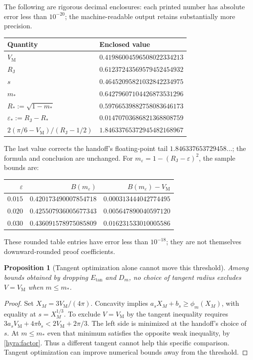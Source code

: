 \documentclass[11pt]{article}
\newtheorem{proposition}[theorem]{Proposition}
\theoremstyle{remark}\newtheorem{remark}[theorem]{Remark}
\newcommand{\VM}{V_{\mathrm M}}
\newcommand{\RJ}{R_{\mathrm J}}
\newcommand{\Et}{E_{\mathrm{tan}}}
\begin{document}
The following are rigorous decimal enclosures: each printed number has absolute error less than $10^{-20}$; the machine-readable output retains substantially more precision.
\begin{center}
\begin{tabular}{ll}\toprule
Quantity & Enclosed value\\\midrule
$\VM$ & $0.41986004596508022334213$\\
$\RJ$ & $0.61237243569579452454932$\\
$s$ & $0.46452095821032842234975$\\
$m_*$ & $0.64279607104426873531296$\\
$R_*:=\sqrt{1-m_*}$ & $0.59766539882758083646173$\\
$\varepsilon_*:=\RJ-R_*$ & $0.01470703686821368808759$\\
$2(\pi/6-\VM)/(\RJ-1/2)$ & $1.84633765372945482168967$\\\bottomrule
\end{tabular}
\end{center}
The last value corrects the handoff's floating-point tail $1.846337653729458\ldots$; the formula and conclusion are unchanged. For $m_\varepsilon=1-(\RJ-\varepsilon)^2$, the sample bounds are:
\begin{center}
\begin{tabular}{rrr}\toprule
$\varepsilon$ & $B(m_\varepsilon)$ & $B(m_\varepsilon)-\VM$\\\midrule
$0.015$ & $0.420173490007854718$ & $0.000313444042774495$\\
$0.020$ & $0.425507936005677343$ & $0.005647890040597120$\\
$0.030$ & $0.436091578975085809$ & $0.016231533010005586$\\\bottomrule
\end{tabular}
\end{center}
These rounded table entries have error less than $10^{-18}$; they are not themselves downward-rounded proof coefficients.

\begin{proposition}[Tangent optimization alone cannot move this threshold]
Among bounds obtained by dropping $\Et$ and $D_m$, no choice of tangent radius excludes $V=\VM$ when $m\leq m_*$.
\end{proposition}
\begin{proof}
Set $X_M=3\VM/(4\pi)$. Concavity implies $a_sX_M+b_s\geq\phi_m(X_M)$, with equality at $s=X_M^{1/3}$. To exclude $V=\VM$ by the tangent inequality requires $3a_s\VM+4\pi b_s<2\VM+2\pi/3$. The left side is minimized at the handoff's choice of $s$. At $m\leq m_*$ even that minimum satisfies the opposite weak inequality, by \eqref{hyra:factor}. Thus a different tangent cannot help this specific comparison. Tangent optimization can improve numerical bounds away from the threshold.
\end{proof}
\end{document}

